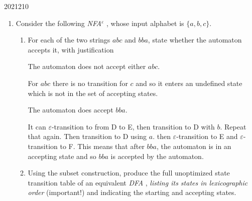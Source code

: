 \documentclass[10pt,\jkfside,a4paper]{article}
\newcommand{\dfa}{\textit{DFA} }
\newcommand{\nfae}{\textit{NFA}$^\varepsilon$ }
\begin{document}
\begin{examquestion}{2021}{2}{10}

\begin{enumerate}

\item Consider the following \nfae, whose input alphabet is $\{a, b, c\}$.

\begin{center}
\end{center}

\begin{enumerate}

\item For each of the two strings $abc$ and $bba$, state whether the automaton accepts it, 
with justification

The automaton does not accept either $abc$.

For $abc$ there is no transition for $c$ and so it enters an undefined state which is 
not in the set of accepting states.

The automaton does accept $bba$.

It can $\varepsilon$-transition to from D to E, then transition to D with $b$. Repeat that again.
Then transition to D using $a$. then $\varepsilon$-transition to E and $\varepsilon$-transition to F. 
This means that after $bba$, the automaton is in an accepting state and so $bba$ is accepted by 
the automaton.

\item Using the subset construction, produce the full unoptimized state transition table of 
an equivalent \dfa, \textit{listing its states in lexicographic order} (important!) and 
indicating the starting and accepting states.


\end{enumerate}
\end{enumerate}
\end{examquestion}
\end{document}
